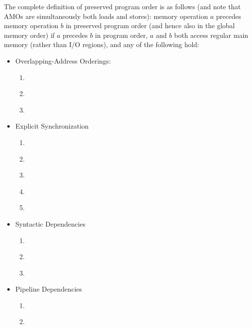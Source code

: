 The complete definition of preserved program order is as follows (and note that AMOs are simultaneously both loads and stores):
memory operation $a$ precedes memory operation $b$ in preserved program order (and hence also in the global memory order) if $a$ precedes $b$ in program order, $a$ and $b$ both access regular main memory (rather than I/O regions), and any of the following hold:

\begin{itemize}
  \item Overlapping-Address Orderings:
    \begin{enumerate}
      \item\label{ppo:->st} \ppost
      \item\label{ppo:rdw} \ppordw
      \item\label{ppo:amoforward} \ppoamoforward
    \end{enumerate}
  \item Explicit Synchronization
    \begin{enumerate}[resume]
      \item\label{ppo:fence} \ppofence
      \item\label{ppo:acquire} \ppoacquire
      \item\label{ppo:release} \pporelease
      \item\label{ppo:rcsc} \pporcsc
      \item\label{ppo:pair} \ppopair
    \end{enumerate}
  \item Syntactic Dependencies
    \begin{enumerate}[resume]
      \item\label{ppo:addr} \ppoaddr
      \item\label{ppo:data} \ppodata
      \item\label{ppo:ctrl} \ppoctrl
    \end{enumerate}
  \item Pipeline Dependencies
    \begin{enumerate}[resume]
      \item\label{ppo:addrdatarfi} \ppoaddrdatarfi
      \item\label{ppo:addrpo} \ppoaddrpo
    \end{enumerate}
\end{itemize}

